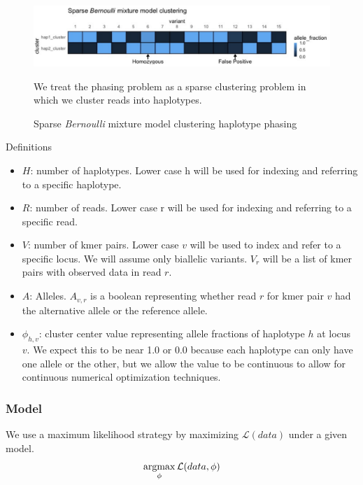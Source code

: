 \begin{figure}[htbp!]
\caption{Sparse \textit{Bernoulli} mixture model clustering haplotype phasing}
\label{figure:scaff}
\begin{centering}
\includegraphics[width=\textwidth]{sparsebernoulli.png}
\par{We treat the phasing problem as a sparse clustering problem in which we cluster reads into haplotypes.}
\end{centering}
\end{figure}

Definitions
\begin{itemize}
\item $H$: number of haplotypes. Lower case h will be used for indexing and referring to a specific haplotype.
\item $R$: number of reads. Lower case r will be used for indexing and referring to a specific read. 
\item $V$: number of kmer pairs. Lower case $v$ will be used to index and refer to a specific locus. We will assume only biallelic variants. $V_r$ will be a list of kmer pairs with observed data in read $r$.
\item $A$: Alleles. $A_{v,r}$ is a boolean representing whether read $r$ for kmer pair $v$ had the alternative allele or the reference allele.
\item $\phi_{h,v}$: cluster center value representing allele fractions of haplotype $h$ at locus $v$. We expect this to be near 1.0 or 0.0 because each haplotype can only have one allele or the other, but we allow the value to be continuous to allow for continuous numerical optimization techniques.
\end{itemize}

\noindent
\subsubsection{Model}

We use a maximum likelihood strategy by maximizing $\mathcal{L}(data)$ under a given model. 
\begin{equation}
\operatorname*{argmax}_{\phi} \mathcal{L}(data, \phi)
\end{equation}


